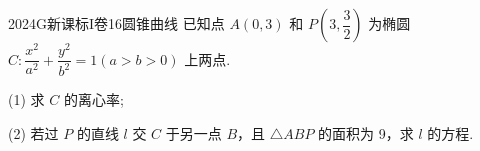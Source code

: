
\begin{problem}{2024}{G}{新课标I卷}{16}{圆锥曲线}
已知点 $A(0,3)$ 和 $P\left(3,\dfrac{3}{2}\right)$ 为椭圆 $C:\dfrac{x^2}{a^2}+\dfrac{y^2}{b^2}=1(a>b>0)$ 上两点.

(1) 求 $C$ 的离心率;

(2) 若过 $P$ 的直线 $l$ 交 $C$ 于另一点 $B$，且 $\triangle ABP$ 的面积为 9，求 $l$ 的方程.
\end{problem}